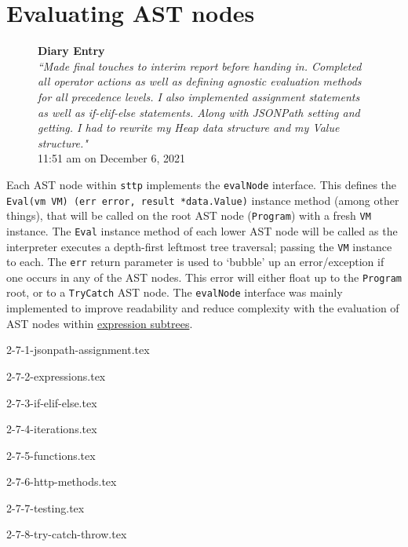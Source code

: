 \documentclass[]{full}
\theoremstyle{definition}
\begin{document}
\section{Evaluating AST nodes}

\begin{figure}[H]
    \begin{center}
        \textbf{Diary Entry}\\[0.5em]
        \textit{``Made final touches to interim report before handing in. Completed all operator actions as well as defining agnostic evaluation methods for all precedence levels. I also implemented assignment statements as well as if-elif-else statements. Along with JSONPath setting and getting. I had to rewrite my Heap data structure and my Value structure."}\\[0.5em]
        \tiny{11:51 am on December 6, 2021}
    \end{center}
\end{figure}
    
Each AST node within \verb|sttp| implements the \verb|evalNode| interface. This defines the \texttt{Eval(vm VM) (err error, result *data.Value)} instance method (among other things), that will be called on the root AST node (\verb|Program|) with a fresh \verb|VM| instance. The \verb|Eval| instance method of each lower AST node will be called as the interpreter executes a depth-first leftmost tree traversal; passing the \verb|VM| instance to each. The \verb|err| return parameter is used to `bubble' up an error/exception if one occurs in any of the AST nodes. This error will either float up to the \verb|Program| root, or to a \verb|TryCatch| AST node. The \verb|evalNode| interface was mainly implemented to improve readability and reduce complexity with the evaluation of AST nodes within \hyperref[sec:development-ast-nodes-expressions]{expression subtrees}.

{2-7-1-jsonpath-assignment.tex}

{2-7-2-expressions.tex}

{2-7-3-if-elif-else.tex}

{2-7-4-iterations.tex}

{2-7-5-functions.tex}

{2-7-6-http-methods.tex}

{2-7-7-testing.tex}

{2-7-8-try-catch-throw.tex}
\end{document}
